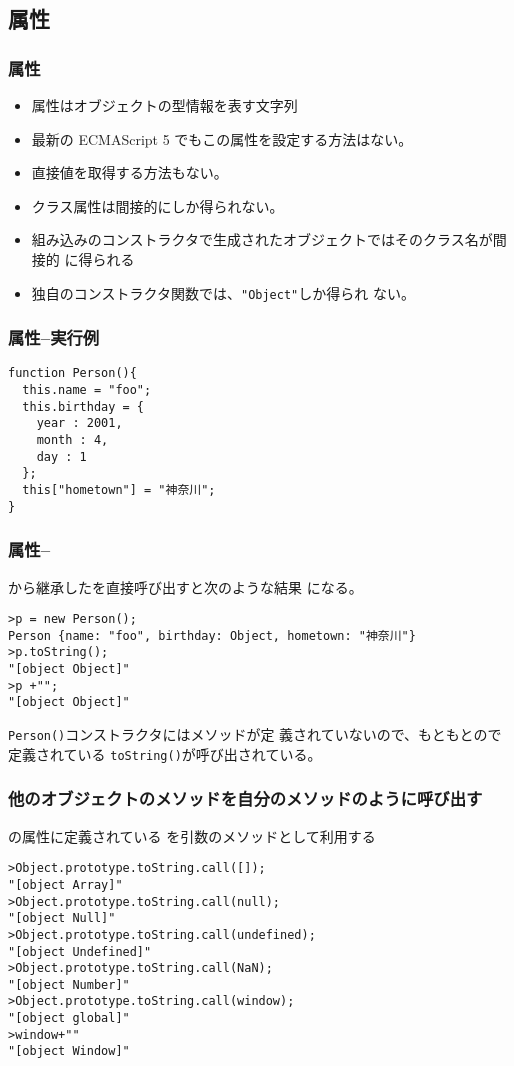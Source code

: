 \documentclass[dvipsk]{beamer}
\begin{document}
\subsection{\protect{}属性}
\begin{frame}[containsverbatim]
 \frametitle{\protect{}属性}
 \begin{itemize}
  \item {}属性はオブジェクトの型情報を表す文字列
  \item 最新の ECMAScript 5 でもこの属性を設定する方法はない。
  \item 直接値を取得する方法もない。
  \item クラス属性は間接的にしか得られない。
  \item 組み込みのコンストラクタで生成されたオブジェクトではそのクラス名が間接的
に得られる
  \item 独自のコンストラクタ関数では、\texttt{"Object"}しか得られ
ない。
 \end{itemize}
 \end{frame}
\begin{frame}[containsverbatim]
 \frametitle{\protect{}属性--実行例}
\begin{verbatim}
function Person(){
  this.name = "foo";
  this.birthday = {
    year : 2001,
    month : 4,
    day : 1
  };
  this["hometown"] = "神奈川";
}
\end{verbatim}
 \end{frame}
\begin{frame}[containsverbatim]
 \frametitle{\protect{}属性--\protect{}}
から継承したを直接呼び出すと次のような結果
 になる。
\begin{verbatim}
>p = new Person();
Person {name: "foo", birthday: Object, hometown: "神奈川"}
>p.toString();
"[object Object]"
>p +"";
"[object Object]"
\end{verbatim}
\texttt{Person()}コンストラクタにはメソッドが定
義されていないので、もともとので定義されている
 \texttt{toString()}が呼び出されている。
\end{frame}
\begin{frame}[containsverbatim]
 \frametitle{他のオブジェクトのメソッドを自分のメソッドのように呼び出す}
 の属性に定義されている
を引数のメソッドとして利用する
\begin{verbatim}
>Object.prototype.toString.call([]);
"[object Array]"
>Object.prototype.toString.call(null);
"[object Null]"
>Object.prototype.toString.call(undefined);
"[object Undefined]"
>Object.prototype.toString.call(NaN);
"[object Number]"
>Object.prototype.toString.call(window);
"[object global]"
>window+""
"[object Window]"
\end{verbatim}
\end{frame}
\end{document}
